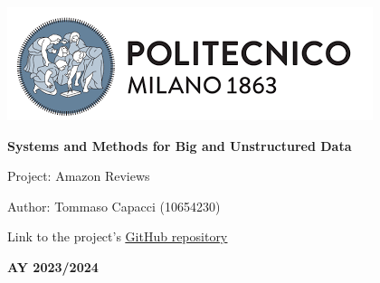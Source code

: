 \documentclass[table, 12pt]{article}
\begin{document}
\begin{titlepage}
    \centering
    \vfill
    \includegraphics[scale=0.9]{Images/PolimiLogo.png}\par\vspace{1cm}
    \vspace{1cm}
    {\huge\bfseries Systems and Methods for Big and Unstructured Data\par Project: Amazon Reviews \par}
    \vspace{3cm}
    {\Large {Author: Tommaso Capacci (10654230)}\par}
    \vspace{0.5cm}
    {\Large {Link to the project's \href{https://github.com/TommasoCapacci/SMBUD_project_23-24}{\color{blue}\underline{GitHub repository}}}\par}
    \vspace{3.5cm}
    {\large \textbf{AY 2023/2024}\par}
    \vfill
\end{titlepage}
\thispagestyle{plain}
\mbox{}
\newpage
{}
\tableofcontents
\newpage
{}
\end{document}
